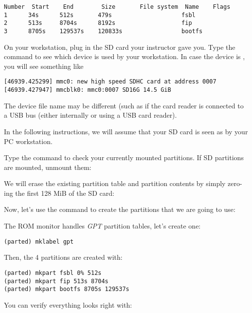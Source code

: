 \begin{verbatim}
Number  Start    End        Size       File system  Name    Flags
1      34s      512s       479s                    fsbl
2      513s     8704s      8192s                   fip
3      8705s    129537s    120833s                 bootfs
\end{verbatim}

On your workstation, plug in the SD card your instructor gave you. Type
the  command to see which device is used by your
workstation. In case the device is , you will see
something like

\begin{verbatim}
[46939.425299] mmc0: new high speed SDHC card at address 0007
[46939.427947] mmcblk0: mmc0:0007 SD16G 14.5 GiB
\end{verbatim}

The device file name may be different (such as 
if the card reader is connected to a USB bus (either internally
or using a USB card reader).

In the following instructions, we will assume that your SD card is
seen as  by your PC workstation.

Type the  command to check your currently mounted
partitions. If SD partitions are mounted, unmount them:


We will erase the existing partition table and partition contents
by simply zero-ing the first 128 MiB of the SD card:


Now, let's use the  command to create the partitions that
we are going to use:


The ROM monitor handles {\em GPT} partition tables, let's create one:

\begin{verbatim}
(parted) mklabel gpt
\end{verbatim}

Then, the 4 partitions are created with:
\begin{verbatim}
(parted) mkpart fsbl 0% 512s
(parted) mkpart fip 513s 8704s
(parted) mkpart bootfs 8705s 129537s
\end{verbatim}

You can verify everything looks right with:

